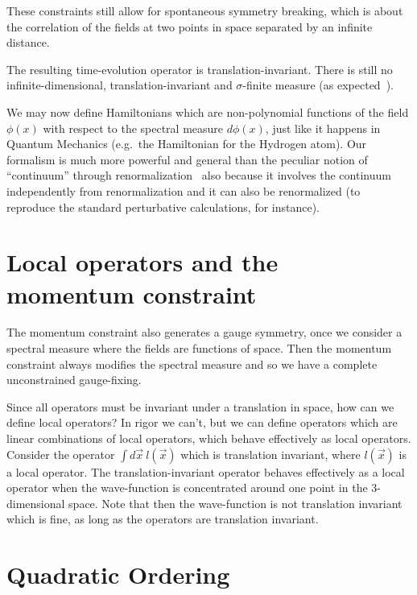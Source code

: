 \documentclass[11pt]{book}
\begin{document}
These constraints still allow for spontaneous symmetry breaking, which
is about the correlation of the fields at two points in space separated
by an infinite
distance\cite{Yang1952Spontaneous}.

The resulting time-evolution operator is translation-invariant. There is
still no infinite-dimensional, translation-invariant and
\(\sigma\)-finite measure (as
expected~\cite{Baker1991ux201cLebesgue}\cite{Baker2004ux201cLebesgue}).

We may now define Hamiltonians which are non-polynomial functions of the
field \(\phi(x)\) with respect to the spectral measure \(d\phi(x)\),
just like it happens in Quantum Mechanics (e.g.~the Hamiltonian for the
Hydrogen atom). Our formalism is much more powerful and general than the
peculiar notion of ``continuum'' through
renormalization~\cite{Lang1986On} also
because it involves the continuum independently from renormalization and
it can also be renormalized (to reproduce the standard perturbative
calculations, for instance).

\hypertarget{local-operators-and-the-momentum-constraint}{%
\section{Local operators and the momentum
constraint}\label{local-operators-and-the-momentum-constraint}}

The momentum constraint also generates a gauge symmetry, once we
consider a spectral measure where the fields are functions of space.
Then the momentum constraint always modifies the spectral measure and so
we have a complete unconstrained gauge-fixing.

Since all operators must be invariant under a translation in space, how
can we define local operators? In rigor we can't, but we can define
operators which are linear combinations of local operators, which behave
effectively as local operators. Consider the operator
\(\int d\vec{x}\ l(\vec{x})\) which is translation invariant, where
\(l(\vec{x})\) is a local operator. The translation-invariant operator
behaves effectively as a local operator when the wave-function is
concentrated around one point in the 3-dimensional space. Note that then
the wave-function is not translation invariant which is fine, as long as
the operators are translation invariant.

\hypertarget{quadratic-ordering}{%
\section{Quadratic Ordering}\label{quadratic-ordering}}
\end{document}
